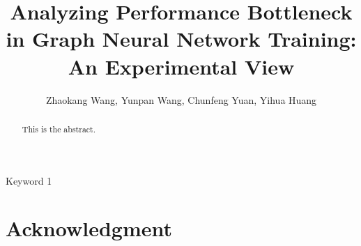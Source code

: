 \documentclass{elsarticle}
\begin{document}
\begin{frontmatter}

\title{Analyzing Performance Bottleneck in Graph Neural Network Training: An Experimental View}
\author{Zhaokang Wang, Yunpan Wang, Chunfeng Yuan, Yihua Huang}
\address{State Key Laboratory for Novel Software Technology, Department of Computer Science and Technology, Nanjing University, Nanjing 210023, China}

\begin{abstract}
    This is the abstract.
\end{abstract}

\begin{keyword}
    Keyword 1
\end{keyword}

\end{frontmatter}

\linenumbers










\section*{Acknowledgment}


\end{document}
